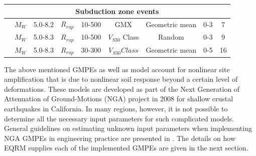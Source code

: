 \begin{landscape}
\begin{table}
{\begin{tabular}{|c|c|c|c|c|c|c|c|c|}
\hline \multicolumn{9}{|c|}{Subduction zone events}\\
\hline \citet{eqrm_Youngs97} & $M_W$ & 5.0-8.2 &
$R_{rup}$& 10-500& GMX & Geometric mean & 0-3 & 7\\
\hline \citet{eqrm_Atkinson03}& $M_W$ & 5.0-8.3 &
$R_{rup}$& 10-500& $V_{S30}$ Class & Random & 0-3 & 9\\
\hline \citet{eqrm_Zhao06} & $M_W$ & 5.0-8.3 & $R_{rup}$ &
30-300& $V_{S30} Class$ & Geometric mean & 0-5 & 16\\
\hline

\end{tabular}}
\end{table}
\end{landscape}




The above mentioned GMPEs as well as \citep{eqrm_Boore08} model
account for nonlinear site amplification that is due to nonlinear
soil response beyond a certain level of deformations. These models
are developed as part of the Next Generation of Attenuation of
Ground-Motions (NGA) project in 2008 for shallow crustal earthquakes
in California. In many regions, however, it is not possible to
determine all the necessary input parameters for such complicated
models. General guidelines on estimating unknown input parameters
when implementing NGA GMPEs in engineering practice are presented in
\citet{eqrm_Kak11}. The details on how EQRM supplies each of the
implemented GMPEs are given in the next section.
